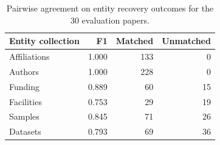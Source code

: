 \begin{table}[t]
  \centering
  \small
  \begin{tabular}{@{}lrrr@{}}
    \toprule
    Entity collection & F1 & Matched & Unmatched \\
    \midrule
    Affiliations & 1.000 & 133 & 0 \\
    Authors & 1.000 & 228 & 0 \\
    Funding & 0.889 & 60 & 15 \\
    Facilities & 0.753 & 29 & 19 \\
    Samples & 0.845 & 71 & 26 \\
    Datasets & 0.793 & 69 & 36 \\
    \bottomrule
  \end{tabular}
  \caption{Pairwise agreement on entity recovery outcomes for
  the 30 evaluation papers.}
  \label{tab:iaa-recovery}
\end{table}
